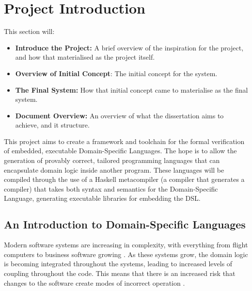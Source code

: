 
\chapter{Project Introduction} %
\label{cha:project_introduction}
This section will:
\begin{itemize}
    \item \textbf{Introduce the Project:} A brief overview of the inspiration for the project, and how that materialised as the project itself.
    \item \textbf{Overview of Initial Concept}: The initial concept for the system.
    \item \textbf{The Final System:} How that initial concept came to materialise as the final system.
    \item \textbf{Document Overview:} An overview of what the dissertation aims to achieve, and it structure. 
\end{itemize}

This project aims to create a framework and toolchain for the formal verification of embedded, executable Domain-Specific Languages.
The hope is to allow the generation of provably correct, tailored programming languages that can encapsulate domain logic inside another program.
These languages will be compiled through the use of a Haskell metacompiler (a compiler that generates a compiler) that takes both syntax and semantics for the Domain-Specific Language, generating executable libraries for embedding the DSL.

\section{An Introduction to Domain-Specific Languages} %
\label{sec:an_introduction_to_domain_specific_languages}
Modern software systems are increasing in complexity, with everything from flight computers to business software growing \citep{dvorak2009nasa}.
As these systems grow, the domain logic is becoming integrated throughout the systems, leading to increased levels of coupling throughout the code.
This means that there is an increased risk that changes to the software create modes of incorrect operation \citep{khawar2001developing}.\\

